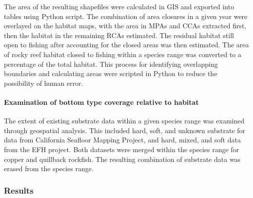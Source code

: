 \documentclass[11pt,
  english,
  a4paper,
]{article}
\begin{document}

The area of the resulting shapefiles were calculated in GIS and exported into tables using Python script. The combination of area closures in a given year were overlayed on the habitat maps, with the area in MPAs and CCAs extracted first, then the habitat in the remaining RCAs estimated. The residual habitat still open to fishing after accounting for the closed areas was then estimated. The area of rocky reef habitat closed to fishing within a species range was converted to a percentage of the total habitat. This process for identifying overlapping boundaries and calculating areas were scripted in Python to reduce the possibility of human error.

\leavevmode\tagmcend\tagstructend\par


\hypertarget{examination-of-bottom-type-coverage-relative-to-habitat}{%
\paragraph{Examination of bottom type coverage relative to habitat}\label{examination-of-bottom-type-coverage-relative-to-habitat}}

\leavevmode\tagmcend\tagstructend


The extent of existing substrate data within a given species range was examined through geospatial analysis. This included hard, soft, and unknown substrate for data from California Seafloor Mapping Project, and hard, mixed, and soft data from the EFH project. Both datasets were merged within the species range for copper and quillback rockfish. The resulting combination of substrate data was erased from the species range.

\leavevmode\tagmcend\tagstructend\par


\hypertarget{results}{%
\subsubsection{Results}\label{results}}

\leavevmode\tagmcend\tagstructend

\end{document}
